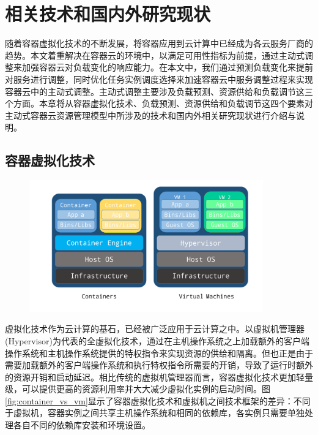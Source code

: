
\chapter{相关技术和国内外研究现状}
\label{chap:art_of_state}
随着容器虚拟化技术的不断发展，将容器应用到云计算中已经成为各云服务厂商的趋势。本文着重解决在容器云的环境中，以满足可用性指标为前提，通过主动式调整来加强容器云对负载变化的响应能力。在本文中，我们通过预测负载变化来提前对服务进行调整，同时优化任务实例调度选择来加速容器云中服务调整过程来实现容器云中的主动式调整。主动式调整主要涉及负载预测、资源供给和负载调节这三个方面。本章将从容器虚拟化技术、负载预测、资源供给和负载调节这四个要素对主动式容器云资源管理模型中所涉及的技术和国内外相关研究现状进行介绍与说明。

\section{容器虚拟化技术} 
\begin{figure}[H]
\centering
\includegraphics[width=0.9\textwidth]{./figure/container-vm}
\end{figure}
虚拟化技术作为云计算的基石，已经被广泛应用于云计算之中\cite{zhang2010cloud}。以虚拟机管理器(Hypervisor)为代表的全虚拟化技术，通过在主机操作系统之上加载额外的客户端操作系统和主机操作系统提供的特权指令来实现资源的供给和隔离。但也正是由于需要加载额外的客户端操作系统和执行特权指令所需要的开销，导致了运行时额外的资源开销和启动延迟\cite{bernstein2014containers}。相比传统的虚拟机管理器而言，容器虚拟化技术更加轻量级，可以提供更高的资源利用率并大大减少虚拟化实例的启动时间\cite{soltesz2007container}。图\ref{fig:container_vs_vm}显示了容器虚拟化技术和虚拟机之间技术框架的差异：不同于虚拟机，容器实例之间共享主机操作系统和相同的依赖库，各实例只需要单独处理各自不同的依赖库安装和环境设置。


